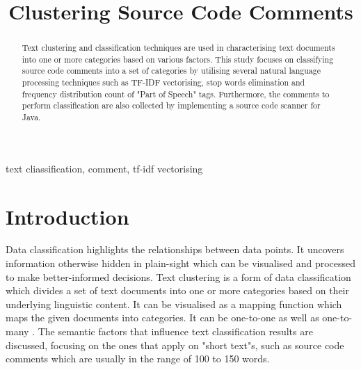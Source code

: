 \documentclass[conference]{IEEEtran}
\begin{document}
\title{Clustering Source Code Comments}

\author{
}

\maketitle

\begin{abstract}
Text clustering and classification techniques are used in characterising text documents into one or more categories based on various factors. This study focuses on classifying source code comments into a set of categories by utilising several natural language processing techniques such as TF-IDF vectorising, stop words elimination and frequency distribution count of "Part of Speech" tags. Furthermore, the comments to perform classification are also collected by implementing a source code scanner for Java.
\end{abstract}

\begin{IEEEkeywords}
text cliassification, comment, tf-idf vectorising
\end{IEEEkeywords}

\section{Introduction}

Data classification highlights the relationships between data points. It uncovers information otherwise hidden in plain-sight which can be visualised and processed to make better-informed decisions. Text clustering is a form of data classification which divides a set of text documents into one or more categories based on their underlying linguistic content. It can be visualised as a mapping function which maps the given documents into categories. It can be one-to-one as well as one-to-many \cite{5557448}. The semantic factors that influence text classification results are discussed, focusing on the ones that apply on "short text"s, such as source code comments which are usually in the range of 100 to 150 words.
\end{document}
